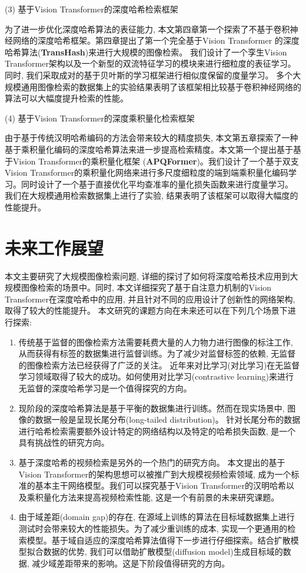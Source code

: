 (3) 基于Vision Transformer的深度哈希检索框架 \par
为了进一步优化深度哈希算法的表征能力, 本文第四章第一个探索了不基于卷积神经网络的深度哈希框架。第四章提出了第一个完全基于Vision Transformer 的深度哈希算法(\textbf{TransHash})来进行大规模的图像检索。 我们设计了一个孪生Vision Transformer架构以及一个新型的双流特征学习的模块来进行细粒度的表征学习。 同时, 我们采取成对的基于贝叶斯的学习框架进行相似度保留的度量学习。 多个大规模通用图像检索的数据集上的实验结果表明了该框架相比较基于卷积神经网络的算法可以大幅度提升检索的性能。\par
(4) 基于Vision Transformer的深度乘积量化检索框架 \par
由于基于传统汉明哈希编码的方法会带来较大的精度损失, 本文第五章探索了一种基于乘积量化编码的深度哈希算法来进一步提高检索精度。本文第一个提出基于基于Vision Transformer的乘积量化框架 (\textbf{APQFormer})。我们设计了一个基于双支Vision Transformer的乘积量化网络来进行多尺度细粒度的端到端乘积量化编码学习。同时设计了一个基于直接优化平均查准率的量化损失函数来进行度量学习。 我们在大规模通用检索数据集上进行了实验, 结果表明了该框架可以取得大幅度的性能提升。

\section{未来工作展望}
本文主要研究了大规模图像检索问题, 详细的探讨了如何将深度哈希技术应用到大规模图像检索的场景中。同时, 本文详细探究了基于自注意力机制的Vision Transformer在深度哈希中的应用, 并且针对不同的应用设计了创新性的网络架构, 取得了较大的性能提升。 本文研究的课题方向在未来还可以在下列几个场景下进行探索:
\begin{enumerate}
    \item 传统基于监督的图像检索方法需要耗费大量的人力物力进行图像的标注工作, 从而获得有标签的数据集进行监督训练。为了减少对监督标签的依赖, 无监督的图像检索方法已经获得了广泛的关注。 近年来对比学习(对比学习)在无监督学习领域取得了较大的成功。如何使用对比学习(contrastive learning)来进行无监督的深度哈希学习是一个值得探究的方向。
    \item 现阶段的深度哈希算法是基于平衡的数据集进行训练。然而在现实场景中, 图像的数据一般是呈现长尾分布(long-tailed distribution)。 针对长尾分布的数据进行哈希检索需要额外设计特定的网络结构以及特定的哈希损失函数, 是一个具有挑战性的研究方向。
    \item 基于深度哈希的视频检索是另外的一个热门的研究方向。 本文提出的基于Vision Transformer的架构思想可以被推广到大规模视频检索领域, 成为一个标准的基本主干网络模型。我们可以探究基于Vision Transformer的汉明哈希以及乘积量化方法来提高视频检索性能, 这是一个有前景的未来研究课题。
    \item 由于域差距(domain gap)的存在, 在源域上训练的算法在目标域数据集上进行测试时会带来较大的性能损失。为了减少重训练的成本, 实现一个更通用的检索模型。基于域自适应的深度哈希算法值得下一步进行仔细探索。结合扩散模型拟合数据的优势, 我们可以借助扩散模型(diffusion model)生成目标域的数据, 减少域差距带来的影响。这是下阶段值得研究的方向。
\end{enumerate}